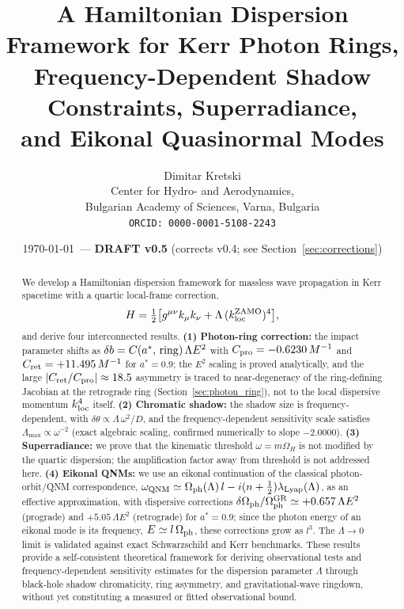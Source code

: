 \documentclass[12pt,a4paper]{article}
\newcommand{\Omph}{\Omega_{\rm ph}}
\newcommand{\lLyap}{\lambda_{\rm Lyap}}
\begin{document}
\title{%
  A Hamiltonian Dispersion Framework for Kerr Photon Rings,\\
  Frequency-Dependent Shadow Constraints, Superradiance,\\
  and Eikonal Quasinormal Modes
}
\author{%
  Dimitar Kretski\\
  Center for Hydro- and Aerodynamics,\\
  Bulgarian Academy of Sciences, Varna, Bulgaria\\
  \texttt{ORCID: 0000-0001-5108-2243}
}
\date{\today\ --- \textbf{DRAFT v0.5} (corrects v0.4; see Section~\ref{sec:corrections})}
\maketitle

\begin{abstract}
We develop a Hamiltonian dispersion framework for massless wave
propagation in Kerr spacetime with a quartic local-frame correction,
\begin{equation*}
  H = \tfrac{1}{2}\bigl[g^{\mu\nu}k_\mu k_\nu
    + \Lambda\,(k_{\rm loc}^{\rm ZAMO})^4\bigr],
\end{equation*}
and derive four interconnected results.
\textbf{(1) Photon-ring correction:}
the impact parameter shifts as $\delta b = C(a^*,\,{\rm ring})\,\Lambda E^2$
with $C_{\rm pro}=-0.6230\,M^{-1}$ and $C_{\rm ret}=+11.495\,M^{-1}$
for $a^*=0.9$; the $E^2$ scaling is proved analytically, and the
large $|C_{\rm ret}/C_{\rm pro}|\approx18.5$ asymmetry is traced to
near-degeneracy of the ring-defining Jacobian at the retrograde ring
(Section~\ref{sec:photon_ring}), not to the local dispersive momentum
$k_{\rm loc}^4$ itself.
\textbf{(2) Chromatic shadow:}
the shadow size is frequency-dependent, with
$\delta\theta\propto\Lambda\,\omega^2/D$,
and the frequency-dependent sensitivity scale satisfies
$\Lambda_{\max}\propto\omega^{-2}$ (exact algebraic scaling,
confirmed numerically to slope $-2.0000$).
\textbf{(3) Superradiance:}
we prove that the kinematic threshold $\omega=m\Omega_H$ is not
modified by the quartic dispersion; the amplification factor away
from threshold is not addressed here.
\textbf{(4) Eikonal QNMs:}
we use an eikonal continuation of the classical photon-orbit/QNM
correspondence, $\omega_{\rm QNM}\simeq\Omph(\Lambda)\,l
-i(n+\tfrac{1}{2})\lLyap(\Lambda)$, as an effective approximation,
with dispersive corrections $\delta\Omph/\Omph^{\rm GR}\simeq+0.657\,\Lambda E^2$
(prograde) and $+5.05\,\Lambda E^2$ (retrograde) for $a^*=0.9$; since the
photon energy of an eikonal mode is its frequency, $E\simeq l\,\Omph$,
these corrections grow as $l^3$. The $\Lambda\to0$ limit is validated
against exact Schwarzschild and Kerr benchmarks.
These results provide a self-consistent theoretical framework for
deriving observational tests and frequency-dependent sensitivity
estimates for the dispersion parameter $\Lambda$ through black-hole
shadow chromaticity, ring asymmetry, and gravitational-wave ringdown,
without yet constituting a measured or fitted observational bound.
\end{abstract}
\end{document}
